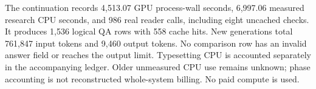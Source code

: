 The continuation records 4,513.07 GPU process-wall seconds, 6,997.06 measured research CPU seconds, and 986 real reader calls, including eight uncached checks. It produces 1,536 logical QA rows with 558 cache hits. New generations total 761,847 input tokens and 9,460 output tokens. No comparison row has an invalid answer field or reaches the output limit. Typesetting CPU is accounted separately in the accompanying ledger. Older unmeasured CPU use remains unknown; phase accounting is not reconstructed whole-system billing. No paid compute is used.
